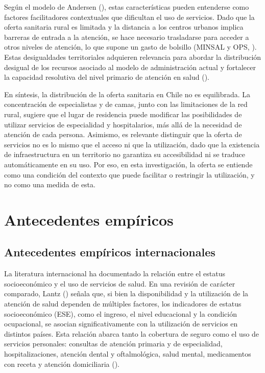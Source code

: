 \documentclass[
  spanish,
  a4paper,
  oneside]{scrbook}
\begin{document}
Según el modelo de Andersen
(), estas características
pueden entenderse como factores facilitadores contextuales que
dificultan el uso de servicios. Dado que la oferta sanitaria rural es
limitada y la distancia a los centros urbanos implica barreras de
entrada a la atención, se hace necesario trasladarse para acceder a
otros niveles de atención, lo que supone un gasto de bolsillo (MINSAL y
OPS, ). Estas
desigualdades territoriales adquieren relevancia para abordar la
distribución desigual de los recursos asociado al modelo de
administración actual y fortalecer la capacidad resolutiva del nivel
primario de atención en salud
().

En síntesis, la distribución de la oferta sanitaria en Chile no es
equilibrada. La concentración de especialistas y de camas, junto con las
limitaciones de la red rural, sugiere que el lugar de residencia puede
modificar las posibilidades de utilizar servicios de especialidad y
hospitalarios, más allá de la necesidad de atención de cada persona.
Asimismo, es relevante distinguir que la oferta de servicios no es lo
mismo que el acceso ni que la utilización, dado que la existencia de
infraestructura en un territorio no garantiza su accesibilidad ni se
traduce automáticamente en su uso. Por eso, en esta investigación, la
oferta se entiende como una condición del contexto que puede facilitar o
restringir la utilización, y no como una medida de esta.


\chapter{Antecedentes empíricos}\label{antecedentes-empuxedricos}

\section{Antecedentes empíricos
internacionales}\label{antecedentes-empuxedricos-internacionales}

La literatura internacional ha documentado la relación entre el estatus
socioeconómico y el uso de servicios de salud. En una revisión de
carácter comparado, Lantz
() señala que, si bien la
disponibilidad y la utilización de la atención de salud dependen de
múltiples factores, los indicadores de estatus socioeconómico (ESE),
como el ingreso, el nivel educacional y la condición ocupacional, se
asocian significativamente con la utilización de servicios en distintos
países. Esta relación abarca tanto la cobertura de seguro como el uso de
servicios personales: consultas de atención primaria y de especialidad,
hospitalizaciones, atención dental y oftalmológica, salud mental,
medicamentos con receta y atención domiciliaria
().
\end{document}
